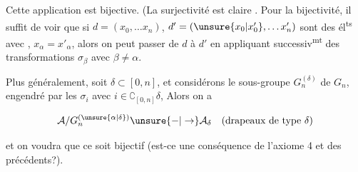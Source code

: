   Cette application est bijective. (La surjectivité est claire . Pour la bijectivité, il suffit de voir que si $d=(x_0,\ldots x_n)$, $d'=(\unsure{x_0|x'_0},\ldots x'_n)$ sont des él\textsuperscript{ts} avec , $x_\alpha=x'_\alpha$, alors  on peut passer de $d$ à $d'$ en appliquant successiv\textsuperscript{mt} des transformations $\sigma_\beta$ avec $\beta\ne\alpha$.


Plus généralement, soit $\delta\subset[0,n]$, \inserted{$\delta\ne\varnothing$} et considérons le sous-groupe $G_n^{(\delta)}$ de $G_n$, engendré par les $\sigma_i$ avec $i\in\complement_{[0,n]}\delta$, Alors on a

\[
 \mathcal A/G_n^{(\unsure{\alpha|\delta})}\unsure{-|\to}\mathcal A_\delta\quad\text{(drapeaux de type }\delta\text{)}
\]

et on voudra que ce soit bijectif (est-ce une conséquence de l'axiome 4 et des précédents?).

